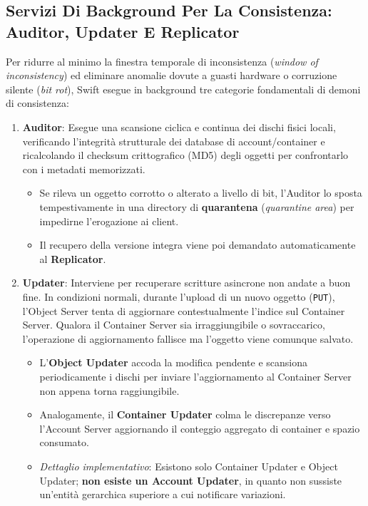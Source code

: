 \documentclass[11pt, a4paper]{article}
\begin{document}
\subsection{Servizi Di Background Per La Consistenza: Auditor, Updater E Replicator}

Per ridurre al minimo la finestra temporale di inconsistenza (\emph{window of inconsistency}) ed eliminare anomalie dovute a guasti hardware o corruzione silente (\emph{bit rot}), Swift esegue in background tre categorie fondamentali di demoni di consistenza:

\begin{enumerate}
    \item \textbf{Auditor}:
    Esegue una scansione ciclica e continua dei dischi fisici locali, verificando l'integrità strutturale dei database di account/container e ricalcolando il checksum crittografico (MD5) degli oggetti per confrontarlo con i metadati memorizzati.
    \begin{itemize}[noitemsep]
        \item Se rileva un oggetto corrotto o alterato a livello di bit, l'Auditor lo sposta tempestivamente in una directory di \textbf{quarantena} (\emph{quarantine area}) per impedirne l'erogazione ai client.
        \item Il recupero della versione integra viene poi demandato automaticamente al \textbf{Replicator}.
    \end{itemize}
    \item \textbf{Updater}:
    Interviene per recuperare scritture asincrone non andate a buon fine. In condizioni normali, durante l'upload di un nuovo oggetto (\texttt{PUT}), l'Object Server tenta di aggiornare contestualmente l'indice sul Container Server. Qualora il Container Server sia irraggiungibile o sovraccarico, l'operazione di aggiornamento fallisce ma l'oggetto viene comunque salvato.
    \begin{itemize}[noitemsep]
        \item L'\textbf{Object Updater} accoda la modifica pendente e scansiona periodicamente i dischi per inviare l'aggiornamento al Container Server non appena torna raggiungibile.
        \item Analogamente, il \textbf{Container Updater} colma le discrepanze verso l'Account Server aggiornando il conteggio aggregato di container e spazio consumato.
        \item \emph{Dettaglio implementativo}: Esistono solo Container Updater e Object Updater; \textbf{non esiste un Account Updater}, in quanto non sussiste un'entità gerarchica superiore a cui notificare variazioni.

\end{itemize}
\end{enumerate}
\end{document}
